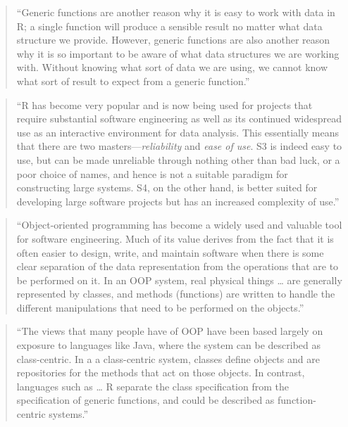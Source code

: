 \documentclass[]{tufte-book}
\begin{document}
\begin{quote}
``Generic functions are another reason why it is easy to work with data in R; a
single function will produce a sensible result no matter what data structure
we provide. However, generic functions are also another reason why it is so
important to be aware of what data structures we are working with. Without
knowing what sort of data we are using, we cannot know what sort of result to
expect from a generic function.'' \citep{murrell2009introduction}
\end{quote}

\begin{quote}
``R has become very popular and is now being used for projects that require
substantial software engineering as well as its continued widespread use as
an interactive environment for data analysis. This essentially means that
there are two masters---\emph{reliability} and \emph{ease of use}. S3 is indeed easy to
use, but can be made unreliable through nothing other than bad luck, or
a poor choice of names, and hence is not a suitable paradigm for constructing
large systems. S4, on the other hand, is better suited for developing large
software projects but has an increased complexity of use.'' \citep{gentleman2008r}
\end{quote}

\begin{quote}
``Object-oriented programming has become a widely used and valuable tool for
software engineering. Much of its value derives from the fact that it is often
easier to design, write, and maintain software when there is some clear
separation of the data representation from the operations that are to be
performed on it. In an OOP system, real physical things \ldots{} are generally
represented by classes, and methods (functions) are written to handle the
different manipulations that need to be performed on the objects.'' \citep{gentleman2008r}
\end{quote}

\begin{quote}
``The views that many people have of OOP have been based largely on
exposure to languages like Java, where the system can be described as class-centric.
In a a class-centric system, classes define objects and are repositories for
the methods that act on those objects. In contrast, languages such as \ldots{} R
separate the class specification from the specification of generic functions,
and could be described as function-centric systems.'' \citep{gentleman2008r}
\end{quote}
\end{document}
